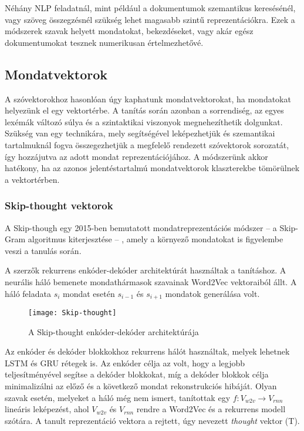 Néhány NLP feladatnál, mint például a dokumentumok szemantikus keresésénél, vagy szöveg összegzésnél szükség lehet magasabb szintű reprezentációkra.  Ezek a módszerek szavak helyett mondatokat, bekezdéseket, vagy akár egész dokumentumokat tesznek numerikusan értelmezhetővé. 

\subsection{Mondatvektorok}
A szóvektorokhoz hasonlóan úgy kaphatunk mondatvektorokat, ha mondatokat helyezünk el egy vektortérbe. A tanítás során azonban a sorrendiség, az egyes lexémák változó súlya és a szintaktikai viszonyok megnehezíthetik dolgunkat. Szükség van egy technikára, mely segítségével leképezhetjük és szemantikai tartalmuknál fogva összegezhetjük a megfelelő rendezett szóvektorok sorozatát, így hozzájutva az adott mondat reprezentációjához. A módszerünk akkor hatékony, ha az azonos jelentéstartalmú mondatvektorok klaszterekbe tömörülnek a vektortérben.

\subsubsection{Skip-thought vektorok}
A Skip-though \cite{skip} egy 2015-ben bemutatott mondatreprezentációs módszer – a Skip-Gram algoritmus kiterjesztése – , amely a környező mondatokat is figyelembe veszi a tanulás során. 

A szerzők rekurrens enkóder-dekóder architektúrát használtak a tanításhoz. A neurális háló bemenete mondathármasok szavainak Word2Vec vektoraiból állt. A háló feladata $s_i$ mondat esetén $s_{i-1}$ és $s_{i+1}$ mondatok generálása volt.

\begin{figure}[H]
	\centering
	\texttt{[image: Skip-thought]}
	\caption{A Skip-thought enkóder-dekóder architektúrája}
\end{figure}

Az enkóder és dekóder blokkokhoz rekurrens hálót használtak, melyek lehetnek LSTM és GRU rétegek is. Az enkóder célja az volt, hogy a legjobb teljesítményével segítse a dekóder blokkokat, míg a dekóder blokkok célja minimalizálni az előző és a következő mondat rekonstrukciós hibáját. Olyan szavak esetén, melyeket a háló még nem ismert, tanítottak egy $f:V_{w2v} \rightarrow V_{rnn}$ lineáris leképezést, ahol $V_{w2v}$ és $V_{rnn}$ rendre a Word2Vec és a rekurrens modell szótára. A tanult reprezentáció vektora a rejtett, úgy nevezett \textit{thought} vektor (T).

